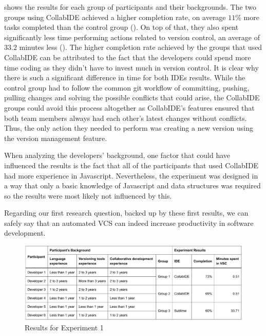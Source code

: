  shows the results for each group of participants and their 
backgrounds. The two groups using CollabIDE achieved a higher completion rate, on average $11\%$ 
more tasks completed than the control group (). On top of that, they 
also spent significantly less time performing actions related to version control, an average of $33.2$  
minutes less (). The higher completion rate achieved by the groups 
that used CollabIDE can be attributed to the fact that the developers could spend more time coding as 
they didn’t have to invest much in version control. It is clear why there is such a significant difference in 
time for both IDEs results. While the control group had to follow the common git workflow of committing, 
pushing, pulling changes and solving the possible conflicts that could arise, the CollabIDE groups could 
avoid this process altogether as CollabIDE’s features ensured that both team members always had 
each other's latest changes without conflicts. Thus, the only action they needed to perform was 
creating a new version using the version management feature.

When analyzing the developers' background, one factor that could have influenced the results is the 
fact that all of the participants that used CollabIDE had more experience in Javascript. Nevertheless, 
the experiment was designed in a way that only a basic knowledge of Javascript and data structures 
was required so the results were most likely not influenced by this.

Regarding our first research question, backed up by these first results, we can safely say that an 
automated \ac{VCS} can indeed increase productivity in software development.

\begin{figure}[htbp]
  \centering
  \includegraphics[width=1\textwidth]{img/resultsTableCollaborative}
  \caption{Results for Experiment 1}
  \label{fig:resultsTableCollaborative}
\end{figure}

